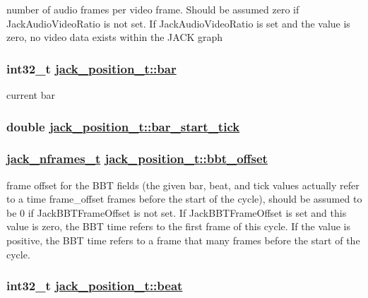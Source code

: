 number of audio frames per video frame. Should be assumed zero if Jack\-Audio\-Video\-Ratio is not set. If Jack\-Audio\-Video\-Ratio is set and the value is zero, no video data exists within the JACK graph \hypertarget{structjack__position__t_37b51d194a7513e45b56f6524f2d51f2}{
\subsubsection[bar]{\setlength{\rightskip}{0pt plus 5cm}int32\_\-t \hyperlink{structjack__position__t_37b51d194a7513e45b56f6524f2d51f2}{jack\_\-position\_\-t::bar}}}
\label{structjack__position__t_37b51d194a7513e45b56f6524f2d51f2}


current bar \hypertarget{structjack__position__t_221202600540df269a7b86ff7061b7eb}{
\subsubsection[bar\_\-start\_\-tick]{\setlength{\rightskip}{0pt plus 5cm}double \hyperlink{structjack__position__t_221202600540df269a7b86ff7061b7eb}{jack\_\-position\_\-t::bar\_\-start\_\-tick}}}
\label{structjack__position__t_221202600540df269a7b86ff7061b7eb}


\hypertarget{structjack__position__t_8c66921efbae8beda14f18a6d3c7f13d}{
\subsubsection[bbt\_\-offset]{\setlength{\rightskip}{0pt plus 5cm}\hyperlink{types_8h_fe9972a13782c1e282747fdb4bc46f9c}{jack\_\-nframes\_\-t} \hyperlink{structjack__position__t_8c66921efbae8beda14f18a6d3c7f13d}{jack\_\-position\_\-t::bbt\_\-offset}}}
\label{structjack__position__t_8c66921efbae8beda14f18a6d3c7f13d}


frame offset for the BBT fields (the given bar, beat, and tick values actually refer to a time frame\_\-offset frames before the start of the cycle), should be assumed to be 0 if Jack\-BBTFrame\-Offset is not set. If Jack\-BBTFrame\-Offset is set and this value is zero, the BBT time refers to the first frame of this cycle. If the value is positive, the BBT time refers to a frame that many frames before the start of the cycle. \hypertarget{structjack__position__t_ed6966981beb595bd0a50e4371805dec}{
\subsubsection[beat]{\setlength{\rightskip}{0pt plus 5cm}int32\_\-t \hyperlink{structjack__position__t_ed6966981beb595bd0a50e4371805dec}{jack\_\-position\_\-t::beat}}}
\label{structjack__position__t_ed6966981beb595bd0a50e4371805dec}


